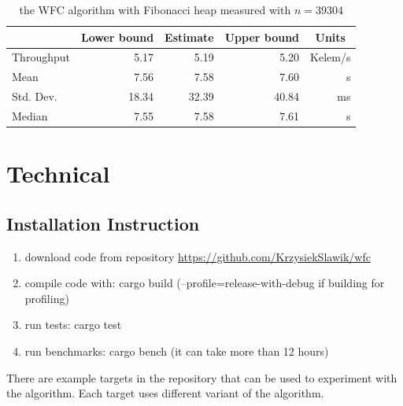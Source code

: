 \documentclass[shortabstract, english, inz]{iithesis}
\begin{document}
\begin{table}[]
\centering
\begin{tabular}{@{}l|r|r|r|r|@{}}
\cmidrule(l){2-5}
\multicolumn{1}{c|}{}            & \multicolumn{1}{c|}{Lower bound} & \multicolumn{1}{c|}{Estimate} & \multicolumn{1}{c|}{Upper bound} & \multicolumn{1}{c|}{Units} \\ \midrule
\multicolumn{1}{|l|}{Throughput} & 5.17                             & 5.19                          & 5.20                             & Kelem/s                    \\ \midrule
\multicolumn{1}{|l|}{Mean}       & 7.56                             & 7.58                          & 7.60                             & s                          \\ \midrule
\multicolumn{1}{|l|}{Std. Dev.}  & 18.34                            & 32.39                         & 40.84                            & ms                         \\ \midrule
\multicolumn{1}{|l|}{Median}     & 7.55                             & 7.58                          & 7.61                             & s                          \\ \bottomrule
\end{tabular}
\caption{the WFC algorithm with Fibonacci heap measured with \(n = 39304\)}
\label{tab:fibheap}
\end{table}

\chapter{Technical}
\label{chapter5}
\section{Installation Instruction}
\begin{enumerate}
    \item download code from repository \url{https://github.com/KrzysiekSlawik/wfc}
    \item compile code with: cargo build (--profile=release-with-debug if building for profiling)
    \item run tests: cargo test
    \item run benchmarks: cargo bench (it can take more than 12 hours)
\end{enumerate}

There are example targets in the repository that can be used to experiment with the algorithm. Each target uses different variant of the algorithm.
\end{document}
